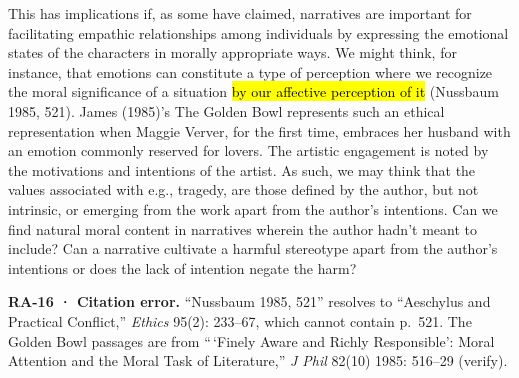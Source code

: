 \documentclass[
  letterpaper,
  DIV=11,
  numbers=noendperiod]{scrartcl}
\theoremstyle{remark}
\begin{document}
This has implications if, as some have claimed, narratives are important
for facilitating empathic relationships among individuals by expressing
the emotional states of the characters in morally appropriate ways. We
might think, for instance, that emotions can constitute a type of
perception where we recognize the moral significance of a situation
\hl{by our affective perception of it} (Nussbaum 1985, 521). James
(1985)'s The Golden Bowl represents such an ethical representation when
Maggie Verver, for the first time, embraces her husband with an emotion
commonly reserved for lovers. The artistic engagement is noted by the
motivations and intentions of the artist. As such, we may think that the
values associated with e.g., tragedy, are those defined by the author,
but not intrinsic, or emerging from the work apart from the author's
intentions. Can we find natural moral content in narratives wherein the
author hadn't meant to include? Can a narrative cultivate a harmful
stereotype apart from the author's intentions or does the lack of
intention negate the harm?

\begin{tcolorbox}[enhanced jigsaw, arc=.35mm, bottomrule=.15mm, bottomtitle=1mm, breakable, colback=white, colbacktitle=quarto-callout-warning-color!10!white, colframe=quarto-callout-warning-color-frame, coltitle=black, left=2mm, leftrule=.75mm, opacityback=0, opacitybacktitle=0.6, rightrule=.15mm, title=\textcolor{quarto-callout-warning-color}{\faExclamationTriangle}\hspace{0.5em}{Warning}, titlerule=0mm, toprule=.15mm, toptitle=1mm]

\textbf{RA-16 · Citation error.} ``Nussbaum 1985, 521'' resolves to
``Aeschylus and Practical Conflict,'' \emph{Ethics} 95(2): 233--67,
which cannot contain p.~521. The Golden Bowl passages are from
``\,`Finely Aware and Richly Responsible': Moral Attention and the Moral
Task of Literature,'' \emph{J Phil} 82(10) 1985: 516--29 (verify).

\end{tcolorbox}
\end{document}
